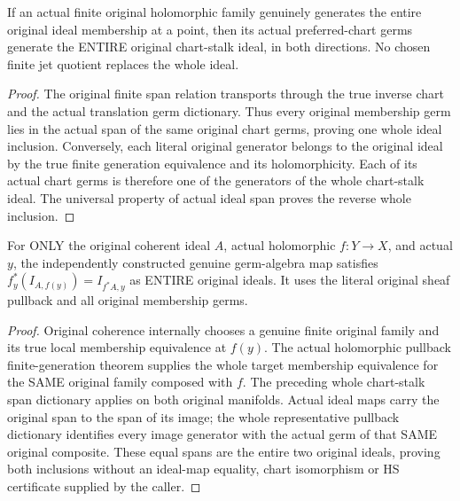 \begin{lemma}
\label{hir:actual-finite-original-whole-chart-stalk-span}
\leanok
If an actual finite original holomorphic family genuinely generates the
entire original ideal membership at a point, then its actual preferred-chart
germs generate the ENTIRE original chart-stalk ideal, in both directions.
No chosen finite jet quotient replaces the whole ideal.
\end{lemma}
\begin{proof}
The original finite span relation transports through the true inverse chart
and the actual translation germ dictionary. Thus every original membership
germ lies in the actual span of the same original chart germs, proving one
whole ideal inclusion. Conversely, each literal original generator belongs
to the original ideal by the true finite generation equivalence and its
holomorphicity. Each of its actual chart germs is therefore one of the
generators of the whole chart-stalk ideal. The universal property of actual
ideal span proves the reverse whole inclusion.
\end{proof}

\begin{theorem}
\label{hir:actual-coherent-whole-stalk-holomorphic-pullback-image}
\leanok
For ONLY the original coherent ideal $A$, actual holomorphic $f:Y\to X$,
and actual $y$, the independently constructed genuine germ-algebra map
satisfies
$f_y^*(I_{A,f(y)})=I_{f^*A,y}$ as ENTIRE original ideals. It uses the
literal original sheaf pullback and all original membership germs.
\end{theorem}
\begin{proof}
Original coherence internally chooses a genuine finite original family and
its true local membership equivalence at $f(y)$. The actual holomorphic
pullback finite-generation theorem supplies the whole target membership
equivalence for the SAME original family composed with $f$. The preceding
whole chart-stalk span dictionary applies on both original manifolds.
Actual ideal maps carry the original span to the span of its image; the
whole representative pullback dictionary identifies every image generator
with the actual germ of that SAME original composite. These equal spans are
the entire two original ideals, proving both inclusions without an ideal-map
equality, chart isomorphism or HS certificate supplied by the caller.
\end{proof}
